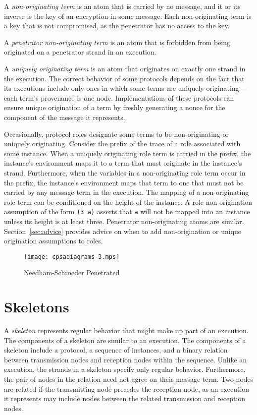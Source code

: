 \documentclass[12pt]{article}
\begin{document}
A \emph{non-originating term} is an atom
that is carried by no message, and it or its inverse is the key of an
encryption in some message.  Each non-originating term is a key that
is not compromised, as the penetrator has no access to the key.

A \emph{penetrator non-originating
  term} is an atom that is forbidden from being originated on a
penetrator strand in an execution.

A \emph{uniquely originating term} is an
atom that originates on exactly one strand in the execution.  The
correct behavior of some protocols depends on the fact that its
executions include only ones in which some terms are uniquely
originating---each term's provenance is one node.  Implementations of
these protocols can ensure unique origination of a term by freshly
generating a nonce for the component of the message it represents.

Occasionally, protocol roles designate some terms to be
non-originating or uniquely originating.  Consider the prefix of the
trace of a role associated with some instance.  When a uniquely
originating role term is carried in the prefix, the instance's
environment maps it to a term that must originate in the instance's
strand.  Furthermore, when the variables in a non-originating role
term occur in the prefix, the instance's environment maps that term to
one that must not be carried by any message term in the execution.
The mapping of a non-originating role term can be conditioned on the
height of the instance.  A role non-origination assumption of the form
\texttt{(3 a)} asserts that \texttt{a} will not be mapped into an
instance unless its height is at least three.  Penetrator
non-originating atoms are similar.  Section~\ref{sec:advice} provides
advice on when to add non-origination or unique origination
assumptions to roles.

\begin{figure}
\begin{center}
\texttt{[image: cpsadiagrams-3.mps]}
\caption{Needham-Schroeder Penetrated}
\label{fig:ns penetrated}
\end{center}
\end{figure}

\section{Skeletons}

A \emph{skeleton} represents regular behavior that might make up part
of an execution.  The components of a skeleton are similar to an
execution.  The components of a skeleton include a protocol, a
sequence of instances, and a binary relation between transmission
nodes and reception nodes within the sequence.  Unlike an execution,
the strands in a skeleton specify only regular behavior.  Furthermore,
the pair of nodes in the relation need not agree on their message
term.  Two nodes are related if the transmitting node precedes the
reception node, as an execution it represents may include nodes
between the related transmission and reception nodes.
\end{document}
